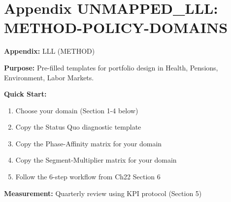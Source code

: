 %
%
%
%
%
%

\newpage
\section*{Appendix UNMAPPED_LLL: METHOD-POLICY-DOMAINS}
\label{app:method-policy-domains}


\begin{tcolorbox}[colback=blue!5!white, colframe=blue!75!black, title=Quick Reference]
\textbf{Appendix:} LLL (METHOD)

\small
\textbf{Purpose:} Pre-filled templates for portfolio design in Health, Pensions, Environment, Labor Markets.

\textbf{Quick Start:}
\begin{enumerate}[nosep]
\item Choose your domain (Section 1-4 below)
\item Copy the Status Quo diagnostic template
\item Copy the Phase-Affinity matrix for your domain
\item Copy the Segment-Multiplier matrix for your domain
\item Follow the 6-step workflow from Ch22 Section 6
\end{enumerate}

\textbf{Measurement:} Quarterly review using KPI protocol (Section 5)
\end{tcolorbox}


